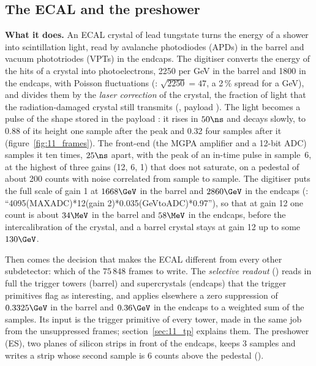 \FloatBarrier
\subsection{The ECAL and the preshower}
\label{sec:11_ecal}

\textbf{What it does.} An ECAL crystal of lead tungstate turns the energy of a shower into scintillation light, read
by avalanche photodiodes (APDs) in the barrel and vacuum phototriodes (VPTs) in the endcaps. The digitiser converts
the energy of the hits of a crystal into photoelectrons, 2250 per GeV in the barrel and 1800 in the endcaps, with
Poisson fluctuations (: $\sqrt{2250}=47$, a 2\,\% spread for a GeV), and divides them by the
\emph{laser correction} of the crystal, the fraction of light that the radiation-damaged crystal still transmits
(, payload ). The light becomes a pulse of the shape stored in
the payload : it rises in $50\ns$ and decays slowly, to 0.88 of its height one sample
after the peak and 0.32 four samples after it (figure~\ref{fig:11_frames}). The front-end (the MGPA amplifier and a
12-bit ADC) samples it ten times, $25\ns$ apart, with the peak of an in-time pulse in sample~6, at the highest of three
gains (12, 6, 1) that does not saturate, on a pedestal of about 200 counts with noise correlated from sample to sample.
The digitiser puts the full scale of gain 1 at $1668\GeV$ in the barrel and $2860\GeV$ in the endcaps
(: ``4095(MAXADC)*12(gain 2)*0.035(GeVtoADC)*0.97''), so that at
gain 12 one count is about $34\MeV$ in the barrel and $58\MeV$ in the endcaps, before the intercalibration of the
crystal, and a barrel crystal stays at gain 12 up to some $130\GeV$.

Then comes the decision that makes the ECAL different from every other subdetector: which of the $75\,848$ frames to
write. The \emph{selective readout} () reads in full the trigger towers (barrel) and supercrystals
(endcaps) that the trigger primitives flag as interesting, and applies elsewhere a zero suppression of $0.3325\GeV$ in
the barrel and $0.36\GeV$ in the endcaps to a weighted sum of the samples. Its input is the trigger primitive of every
tower, made in the same job from the unsuppressed frames; section~\ref{sec:11_tp} explains them. The preshower (ES), two
planes of silicon strips in front of the endcaps, keeps 3 samples and writes a strip whose second sample is 6 counts
above the pedestal ().

